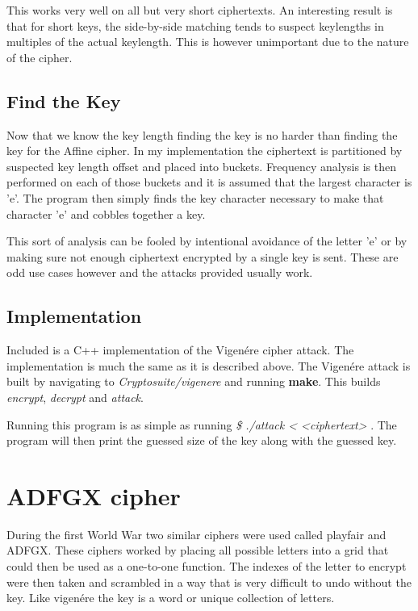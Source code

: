 This works very well on all but very short ciphertexts.
An interesting result is that for short keys, the side-by-side matching tends to suspect keylengths in multiples of the actual keylength.
This is however unimportant due to the nature of the cipher.

\subsection{ Find the Key}

Now that we know the key length finding the key is no harder than finding the key for the Affine cipher.
In my implementation the ciphertext is partitioned by suspected key length offset and placed into buckets.
Frequency analysis is then performed on each of those buckets and it is assumed that the largest character is 'e'.
The program then simply finds the key character necessary to make that character 'e' and cobbles together a key.

This sort of analysis can be fooled by intentional avoidance of the letter 'e' or by making sure not enough ciphertext encrypted by a single key is sent.
These are odd use cases however and the attacks provided usually work.

\subsection{ Implementation}

Included is a C++ implementation of the Vigen\'ere cipher attack. 
The implementation is much the same as it is described above.
The Vigen\'ere attack is built by navigating to \textit{Cryptosuite/vigenere} and running \textbf{make}. This builds \textit{encrypt}, \textit{decrypt} and \textit{attack}.

Running this program is as simple as running \textit{\$ ./attack < <ciphertext> }. The program will then print the guessed size of the key along with the guessed key.

\section{ADFGX cipher}

During the first World War two similar ciphers were used called playfair and ADFGX. 
These ciphers worked by placing all possible letters into a grid that could then be used as a one-to-one function.
The indexes of the letter to encrypt were then taken and scrambled in a way that is very difficult to undo without the key.
Like vigen\'ere the key is a word or unique collection of letters.

